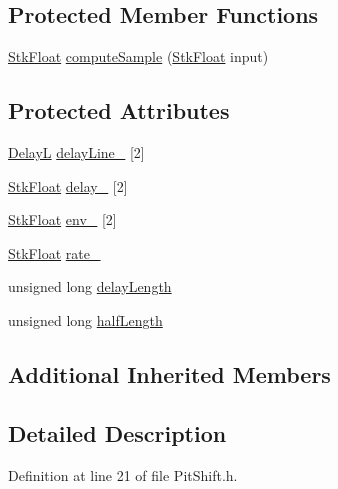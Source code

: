 \subsection*{Protected Member Functions}
\begin{DoxyCompactItemize}
\item 
\hyperlink{namespace_nyq_a044fa20a706520a617bbbf458a7db7e4}{Stk\+Float} \hyperlink{class_nyq_1_1_pit_shift_af595bc038a8d5bb77821d050ff4009cd}{compute\+Sample} (\hyperlink{namespace_nyq_a044fa20a706520a617bbbf458a7db7e4}{Stk\+Float} input)
\end{DoxyCompactItemize}
\subsection*{Protected Attributes}
\begin{DoxyCompactItemize}
\item 
\hyperlink{class_nyq_1_1_delay_l}{DelayL} \hyperlink{class_nyq_1_1_pit_shift_a739400e0b6dfa15fb81af53aca21bbb2}{delay\+Line\+\_\+} \mbox{[}2\mbox{]}
\item 
\hyperlink{namespace_nyq_a044fa20a706520a617bbbf458a7db7e4}{Stk\+Float} \hyperlink{class_nyq_1_1_pit_shift_aefbb311953198a8708549c5c88d2ef6c}{delay\+\_\+} \mbox{[}2\mbox{]}
\item 
\hyperlink{namespace_nyq_a044fa20a706520a617bbbf458a7db7e4}{Stk\+Float} \hyperlink{class_nyq_1_1_pit_shift_a51df5294bf6aff002c474470f833f014}{env\+\_\+} \mbox{[}2\mbox{]}
\item 
\hyperlink{namespace_nyq_a044fa20a706520a617bbbf458a7db7e4}{Stk\+Float} \hyperlink{class_nyq_1_1_pit_shift_a1ca53d086a62211042e0bf9117bddb2d}{rate\+\_\+}
\item 
unsigned long \hyperlink{class_nyq_1_1_pit_shift_a457baebe37ff314c99f47e2d0d9a7675}{delay\+Length}
\item 
unsigned long \hyperlink{class_nyq_1_1_pit_shift_a73b9629d4c1ee9bd2f120f360715dd01}{half\+Length}
\end{DoxyCompactItemize}
\subsection*{Additional Inherited Members}


\subsection{Detailed Description}


Definition at line 21 of file Pit\+Shift.\+h.



